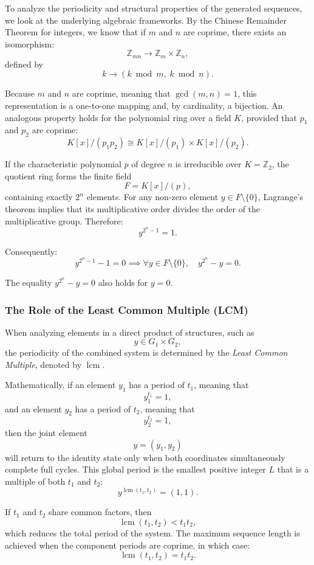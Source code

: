 To analyze the periodicity and structural properties of the generated sequences, we look at the underlying algebraic frameworks. By the Chinese Remainder Theorem for integers, we know that if $m$ and $n$ are coprime, there exists an isomorphism:
\[
\mathbb{Z}_{mn}\rightarrow\mathbb{Z}_m\times\mathbb{Z}_n,
\]
defined by
\[
k\rightarrow(k\bmod m,\;k\bmod n).
\]

Because $m$ and $n$ are coprime, meaning that $\gcd(m,n)=1$, this representation is a one-to-one mapping and, by cardinality, a bijection. An analogous property holds for the polynomial ring over a field $K$, provided that $p_1$ and $p_2$ are coprime:
\[
K[x]/(p_1p_2)\cong K[x]/(p_1)\times K[x]/(p_2).
\]

If the characteristic polynomial $p$ of degree $n$ is irreducible over $K=\mathbb{Z}_2$, the quotient ring forms the finite field
\[
F=K[x]/(p),
\]
containing exactly $2^n$ elements. For any non-zero element $y\in F\setminus\{0\}$, Lagrange's theorem implies that its multiplicative order divides the order of the multiplicative group. Therefore:
\[
y^{2^n-1}=1.
\]

Consequently:
\[
y^{2^n-1}-1=0
\implies
\forall y\in F\setminus\{0\},\quad y^{2^n}-y=0.
\]

The equality $y^{2^n}-y=0$ also holds for $y=0$.

\subsubsection{The Role of the Least Common Multiple (LCM)}

When analyzing elements in a direct product of structures, such as
\[
y\in G_1\times G_2,
\]
the periodicity of the combined system is determined by the \textit{Least Common Multiple}, denoted by $\operatorname{lcm}$.

Mathematically, if an element $y_1$ has a period of $t_1$, meaning that
\[
y_1^{t_1}=1,
\]
and an element $y_2$ has a period of $t_2$, meaning that
\[
y_2^{t_2}=1,
\]
then the joint element
\[
y=(y_1,y_2)
\]
will return to the identity state only when both coordinates simultaneously complete full cycles. This global period is the smallest positive integer $L$ that is a multiple of both $t_1$ and $t_2$:
\[
y^{\operatorname{lcm}(t_1,t_2)}=(1,1).
\]

If $t_1$ and $t_2$ share common factors, then
\[
\operatorname{lcm}(t_1,t_2)<t_1t_2,
\]
which reduces the total period of the system. The maximum sequence length is achieved when the component periods are coprime, in which case:
\[
\operatorname{lcm}(t_1,t_2)=t_1t_2.
\]

